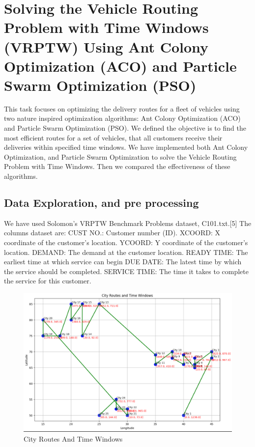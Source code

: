 \section{Solving the Vehicle Routing Problem with Time Windows (VRPTW) Using Ant Colony Optimization (ACO) and Particle Swarm Optimization (PSO)}
This task focuses on optimizing the delivery routes for a fleet of vehicles using two nature inspired optimization algorithms: Ant Colony Optimization (ACO) and Particle Swarm Optimization (PSO). 
\newline
We defined the objective is to find the most efficient routes for a set of vehicles, that all customers receive their deliveries within specified time windows. 
\newline
We have implemented both Ant Colony Optimization, and Particle Swarm Optimization to solve the Vehicle Routing Problem with Time Windows. Then we compared the effectiveness of these algorithms. 
\newline
\subsection{Data Exploration, and pre processing}
We have used Solomon’s VRPTW Benchmark Problems dataset, C101.txt.[5]
\newline
The columns dataset are:
\newline
CUST NO.: Customer number (ID).
\newline
XCOORD: X coordinate of the customer's location.
\newline
YCOORD: Y coordinate of the customer's location.
\newline
DEMAND: The demand at the customer location.
\newline
READY TIME: The earliest time at which service can begin DUE DATE: The latest time by which the service should be completed.
\newline
SERVICE TIME: The time it takes to complete the service for this customer.
\newline
\begin{figure}[h]
    \centering
    \includegraphics[width=1\linewidth]{figures/Citye_Routes_And_Time_Windows.PNG}
    \caption{City Routes And Time Windows}
    \label{fig:PSO Algorithms Analyse}
\end{figure}
